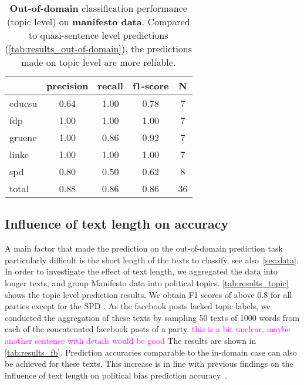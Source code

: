 \documentclass[11pt]{article}
\newcommand{\ssc}[1]{\textcolor{magenta}{#1}}
\begin{document}
\begin{table}[t]
\caption{
\label{tab:results_topic}
{\bf Out-of-domain} classification performance (topic level) on {\bf manifesto data}. Compared to quasi-sentence level predictions (\autoref{tab:results_out-of-domain}), the predictions made on topic level are more reliable.}
\begin{center}
\begin{tabular}{lcccc}
    &         precision    &recall &  f1-score  & N  \\
    \hline
        \hline
cducsu     &  0.64  &    1.00  &    0.78    &     7\\
       fdp    &   1.00    &  1.00    &  1.00    &     7\\
    gruene  &     1.00  &    0.86  &    0.92    &     7\\
     linke    &   1.00   &   1.00     & 1.00    &     7\\
       spd   &    0.80   &   0.50    &  0.62     &    8\\
    \hline
total  &     0.88   &   0.86   &   0.86  &      36\\
\end{tabular}
\end{center}
\end{table}


\subsection{Influence of text length on accuracy}
A main factor that made the prediction on the out-of-domain prediction task particularly difficult is the short length of the texts to classify, see also~\autoref{sec:data}. In order to investigate the effect of text length, we aggregated the data into longer texts, and group Manifesto data into political topics. \autoref{tab:results_topic} shows the topic level prediction results. We obtain F1 scores of above 0.8 for all parties except for the SPD . As the facebook posts lacked topic labels, we conducted the aggregation of these texts by sampling 50 texts of 1000 words from each of the concatenated facebook posts of a party. \ssc{this is a bit unclear, maybe another sentence with details would be good} The results are shown in \autoref{tab:results_fb}. Prediction accuracies comparable to the in-domain case can also be achieved for these texts. This increase is in line with previous findings on the influence of text length on political bias prediction accuracy~\cite{Hirst2014}. 
\end{document}
